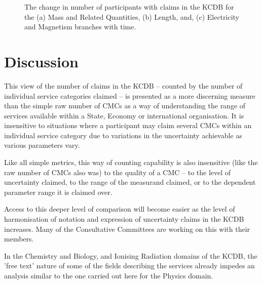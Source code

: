 \documentclass[
	a4paper, %
	10pt, %
	unnumberedsections, %
	twoside, %
]{LTJournalArticle}
\begin{document}
\begin{figure}[!t]
\caption{The change in number of participants with claims in the KCDB for the (a) Mass and Related Quantities, (b) Length, and, (c) Electricity and Magnetism branches with time.}
\label{fig:Branch_growth_b}
\end{figure}

\section{Discussion}

This view of the number of claims in the KCDB -- counted by the number of individual service categories claimed -- is presented as a more discerning measure than the simple raw number of CMCs as a way of understanding the range of services available within a State, Economy or international organisation. It is insensitive to situations where a participant may claim several CMCs within an individual service category due to variations in the uncertainty achievable as various parameters vary.

Like all simple metrics, this way of counting capability is also insensitive (like the raw number of CMCs also was) to the quality of a CMC -- to the level of uncertainty claimed, to the range of the measurand claimed, or to the dependent parameter range it is claimed over.

Access to this deeper level of comparison will become easier as the level of harmonisation of notation and expression of uncertainty claims in the KCDB increases. Many of the Consultative Committees are working on this with their members.

In the Chemistry and Biology, and Ionising Radiation domains of the KCDB, the 'free text' nature of some of the fields describing the services already impedes an analysis similar to the one carried out here for the Physics domain.


\printbibliography %

\end{document}
